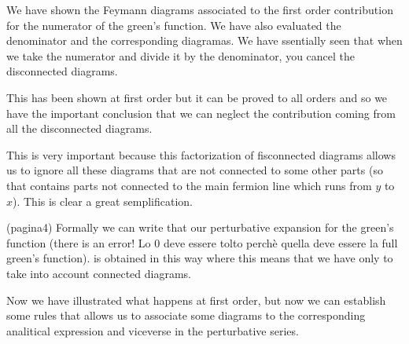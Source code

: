 \documentclass[../main/main.tex]{subfiles}
\begin{document}

We have shown the Feymann diagrams associated to the first order contribution for the numerator of the green's function. We have also evaluated the denominator and the corresponding diagramas.  We have ssentially seen that when we take the numerator and divide it by the denominator, you cancel the disconnected diagrams.


This has been shown at first order but it can be proved to all orders and so we have the important conclusion that we can neglect the contribution coming from all the disconnected diagrams.


This is very important because this factorization of fisconnected diagrams allows us to ignore all these diagrams that are not connected to some other parts (so that contains parts not connected to the main fermion line which runs from \( y \) to \( x \)). This is clear a great semplification.

(pagina4)
Formally we can write that our perturbative expansion for the green's function (there is an error! Lo 0 deve essere tolto perchè quella deve essere la full green's function).
is obtained in this way where this means that we have only to take into account connected diagrams.



Now we have illustrated what happens at first order, but now we can establish some rules that allows us to associate some diagrams to the corresponding analitical expression and viceverse in the perturbative series.
\end{document}

